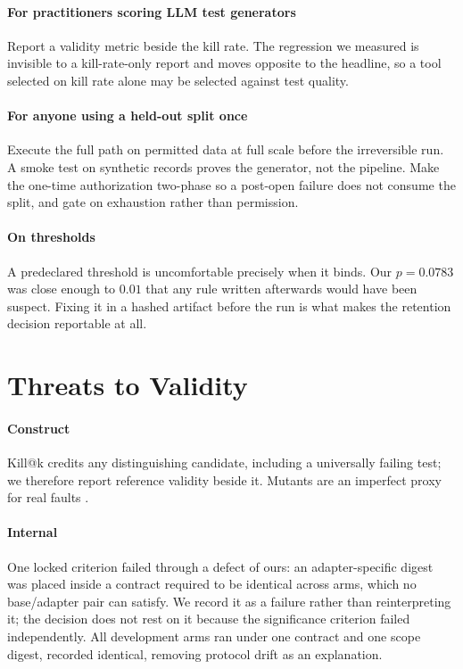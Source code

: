 \documentclass[10pt,conference,letterpaper]{IEEEtran}
\makeatletter
\newcommand{\killk}[1]{Kill@#1}
\makeatother
\begin{document}
\paragraph{For practitioners scoring LLM test generators}
Report a validity metric beside the kill rate. The regression we measured is
invisible to a kill-rate-only report and moves opposite to the headline, so a
tool selected on kill rate alone may be selected against test quality.

\paragraph{For anyone using a held-out split once}
Execute the full path on permitted data at full scale before the irreversible
run. A smoke test on synthetic records proves the generator, not the pipeline.
Make the one-time authorization two-phase so a post-open failure does not consume
the split, and gate on exhaustion rather than permission.

\paragraph{On thresholds}
A predeclared threshold is uncomfortable precisely when it binds. Our
$p = 0.0783$ was close enough to $0.01$ that any rule written afterwards would
have been suspect. Fixing it in a hashed artifact before the run is what makes
the retention decision reportable at all.

\section{Threats to Validity}

\paragraph{Construct}
\killk{k} credits any distinguishing candidate, including a universally failing
test; we therefore report reference validity beside it. Mutants are an imperfect
proxy for real faults \cite{just2014mutants,papadakis2018mutationscores}.

\paragraph{Internal}
One locked criterion failed through a defect of ours: an adapter-specific digest
was placed inside a contract required to be identical across arms, which no
base/adapter pair can satisfy. We record it as a failure rather than
reinterpreting it; the decision does not rest on it because the significance
criterion failed independently. All development arms ran under one contract and
one scope digest, recorded identical, removing protocol drift as an explanation.
\end{document}
